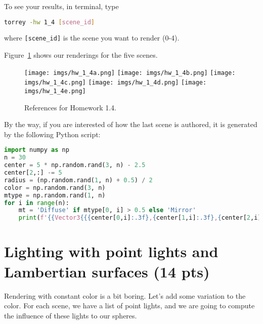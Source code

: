 To see your results, in terminal, type
\begin{lstlisting}[language=bash]
  torrey -hw 1_4 [scene_id]
\end{lstlisting}
where \lstinline{[scene_id]} is the scene you want to render (0-4).

Figure~\ref{fig:hw_1_4} shows our renderings for the five scenes.

\begin{figure}[ht]
    \centering
    \texttt{[image: imgs/hw\_1\_4a.png]}
    \texttt{[image: imgs/hw\_1\_4b.png]}
    \texttt{[image: imgs/hw\_1\_4c.png]}
    \texttt{[image: imgs/hw\_1\_4d.png]}
    \texttt{[image: imgs/hw\_1\_4e.png]}
    \caption{References for Homework 1.4.}
    \label{fig:hw_1_4}
\end{figure}

By the way, if you are interested of how the last scene is authored, it is generated by the following Python script:
\begin{lstlisting}[language=Python]
import numpy as np
n = 30
center = 5 * np.random.rand(3, n) - 2.5
center[2,:] -= 5
radius = (np.random.rand(1, n) + 0.5) / 2
color = np.random.rand(3, n)
mtype = np.random.rand(1, n)
for i in range(n):
    mt = 'Diffuse' if mtype[0, i] > 0.5 else 'Mirror'
    print(f'{{Vector3{{{center[0,i]:.3f},{center[1,i]:.3f},{center[2,i]:.3f}}}, {radius[0, i]:.3f}, Vector3{{{color[0,i]:.3f},{color[1,i]:.3f},{color[2,i]:.3f}}}, MaterialType::{mt}}},')
\end{lstlisting}

\section{Lighting with point lights and Lambertian surfaces (14 pts)}
Rendering with constant color is a bit boring. Let's add some variation to the color. For each scene, we have a list of point lights, and we are going to compute the influence of these lights to our spheres.

